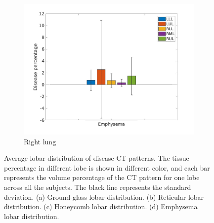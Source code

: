 \begin{figure}[H]
\begin{subfigure}{.46\linewidth}
  \includegraphics[width=\linewidth,trim={{.0\wd0} {.0\wd0} {.0\wd0} {.0\wd0}},clip]{QuantitativeAnalysis/Image/EmphysemaLobarRegionDiseaseDistribution.jpg}
  \caption{Right lung}
  \label{fig:LobarRegionDiseaseDistribution-d}
\end{subfigure}
\caption{Average lobar distribution of disease CT patterns. The tissue percentage in different lobe is shown in different color, and each bar represents the volume percentage of the CT pattern for one lobe across all the subjects. The black line represents the standard deviation. (a) Ground-glass lobar distribution. (b) Reticular lobar distribution. (c) Honeycomb lobar distribution. (d) Emphysema lobar distribution.}
\label{fig:LobarRegionDiseaseDistribution}
\end{figure}

